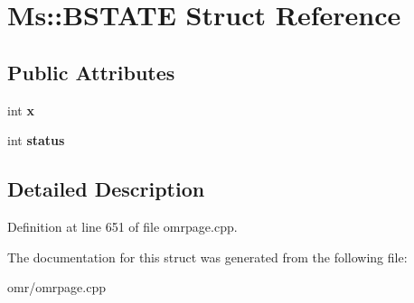 \hypertarget{struct_ms_1_1_b_s_t_a_t_e}{}\section{Ms\+:\+:B\+S\+T\+A\+TE Struct Reference}
\label{struct_ms_1_1_b_s_t_a_t_e}
\subsection*{Public Attributes}
\begin{DoxyCompactItemize}
\item 
\mbox{\label{struct_ms_1_1_b_s_t_a_t_e_a4eb70ae6c36fc4e16ab1804154517172}} 
int {\bfseries x}
\item 
\mbox{\label{struct_ms_1_1_b_s_t_a_t_e_a355fe5597b731b302e4839a71258f0e2}} 
int {\bfseries status}
\end{DoxyCompactItemize}


\subsection{Detailed Description}


Definition at line 651 of file omrpage.\+cpp.



The documentation for this struct was generated from the following file\+:\begin{DoxyCompactItemize}
\item 
omr/omrpage.\+cpp\end{DoxyCompactItemize}

